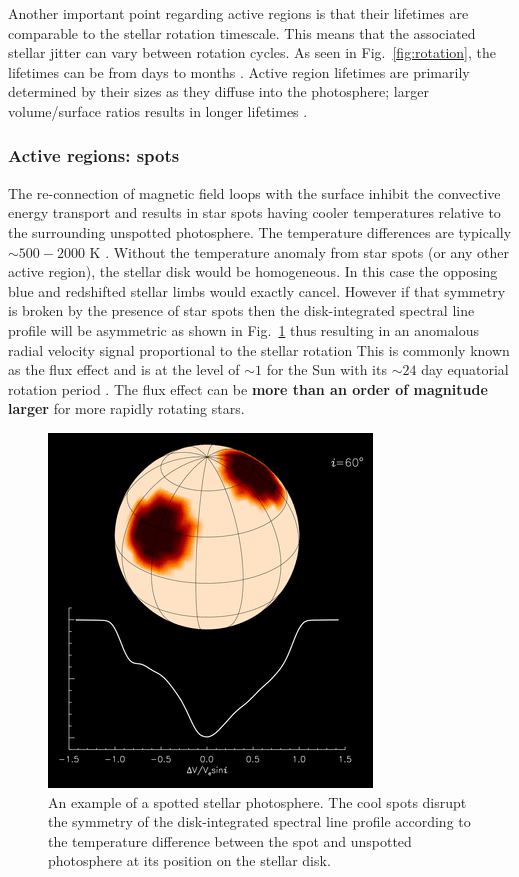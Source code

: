 Another important point regarding active regions is that their lifetimes are comparable 
to the stellar rotation timescale. This means that the associated stellar jitter can vary 
between rotation cycles. As seen in Fig.~\ref{fig:rotation}, 
the lifetimes can be from days to months 
\parencite{schrijver02}. Active region 
lifetimes are primarily determined by their sizes \parencite{berdyugina05} as they 
diffuse into the photosphere; larger volume/surface ratios results in longer lifetimes 
\parencite{robinson82, petrovay97}. 

\subsubsection{Active regions: spots} \label{sect:spots}
The re-connection of magnetic field loops with the surface inhibit the convective energy 
transport and results in star spots having cooler temperatures relative to the surrounding 
unspotted photosphere. The temperature differences are typically 
$\sim 500-2000$ K \parencite{schrijver02, berdyugina05}. Without the temperature  
anomaly from star spots (or any other active region), 
the stellar disk would be homogeneous. In this case the opposing 
blue and redshifted stellar limbs would exactly cancel. 
However if that symmetry is broken by the 
presence of star spots then the disk-integrated spectral line profile will be asymmetric 
as shown in Fig.~\ref{fig:starspot} thus resulting in an anomalous radial velocity 
signal proportional to the stellar rotation  This is commonly known as the 
flux effect and is at the level of $\sim 1$ \mps{} for the Sun with its $\sim 24$ day 
equatorial rotation period \parencite{lagrange11}. The flux effect can be \textbf{more 
than an order of magnitude larger} for more rapidly rotating stars. \\

\begin{figure}
\centering
\includegraphics[scale=.5]{figures/starspot.png}
\caption{An example of a spotted stellar photosphere. The cool spots disrupt the symmetry of the 
disk-integrated spectral line profile according to the temperature difference between the spot and 
unspotted photosphere at its position on the stellar disk. 
\parencite[Image credit:][]{kochukhov16} \label{fig:starspot}}
\end{figure}

